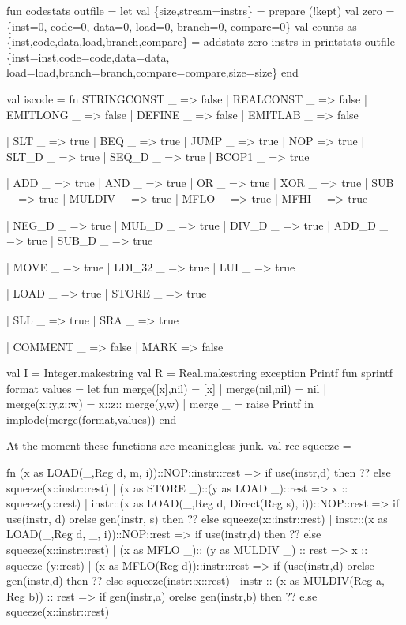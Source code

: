 fun codestats outfile =
    let val \{size,stream=instrs\} = prepare (!kept)
        val zero = \{inst=0, code=0, data=0, load=0, branch=0, compare=0\}
        val counts as \{inst,code,data,load,branch,compare\} = 
                                                addstats zero instrs
    in  printstats outfile 
            \{inst=inst,code=code,data=data,
             load=load,branch=branch,compare=compare,size=size\}
    end
        
\endcode
{}
\endmoddef
val iscode = fn
    STRINGCONST _ => false
  | REALCONST _ => false
  | EMITLONG _ => false
  | DEFINE _ => false
  | EMITLAB _ => false

  | SLT _ => true
  | BEQ _ => true
  | JUMP _ => true
  | NOP => true
  | SLT_D _ => true
  | SEQ_D _ => true
  | BCOP1 _ => true

  | ADD _ => true
  | AND _ => true
  | OR  _ => true
  | XOR _ => true
  | SUB _ => true
  | MULDIV _ => true
  | MFLO _ => true
  | MFHI _ => true

  | NEG_D _ => true
  | MUL_D _ => true
  | DIV_D _ => true
  | ADD_D _ => true
  | SUB_D _ => true

  | MOVE _ => true
  | LDI_32 _ => true
  | LUI _ => true

  | LOAD _ => true
  | STORE  _ => true

  | SLL _ => true
  | SRA _ => true

  | COMMENT _ => false
  | MARK => false

\endcode
{}
\endmoddef
val I = Integer.makestring
val R = Real.makestring
exception Printf
fun sprintf format values =
    let fun merge([x],nil) = [x]
          | merge(nil,nil) = nil
          | merge(x::y,z::w) = x::z:: merge(y,w)
          | merge _ = raise Printf
    in  implode(merge(format,values))
    end

\endcode
{}

At the moment these functions are meaningless junk.
\enddocs
{}
\endmoddef
val rec squeeze =

 fn (x as LOAD(_,Reg d, m, i))::NOP::instr::rest =>
        if use(instr,d) then ??
        else squeeze(x::instr::rest)
  | (x as STORE _)::(y as LOAD _)::rest => 
        x :: squeeze(y::rest)
  | instr::(x as LOAD(_,Reg d, Direct(Reg s), i))::NOP::rest =>
        if use(instr, d) orelse gen(instr, s) then ??
        else squeeze(x::instr::rest)
  | instr::(x as LOAD(_,Reg d, _, i))::NOP::rest =>
        if use(instr,d) then ??
        else squeeze(x::instr::rest)
  | (x as MFLO _):: (y as MULDIV _) :: rest =>
        x :: squeeze (y::rest)
  | (x as MFLO(Reg d))::instr::rest =>
        if (use(instr,d) orelse gen(instr,d) then ??
        else squeeze(instr::x::rest)
  | instr :: (x as MULDIV(Reg a, Reg b)) :: rest =>
        if gen(instr,a) orelse gen(instr,b) then ??
        else squeeze(x::instr::rest)

